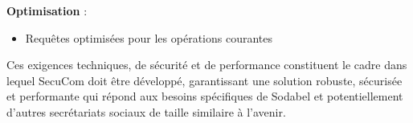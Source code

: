 \vspace{0.5cm}
\textbf{Optimisation} :
\begin{itemize}[leftmargin=*,label=\textcolor{darkgray}{$\bullet$},itemsep=0.3em]
  \item Requêtes optimisées pour les opérations courantes
\end{itemize}

\vspace{1cm}

\begin{tcolorbox}[
  title={\textbf{Cadre des exigences}},
  colback=blue!5!white,
  colframe=primarycolor,
  fonttitle=\bfseries,
  boxrule=0.5mm,
  arc=2mm,
  left=6mm,
  right=6mm,
  top=6mm,
  bottom=6mm
]
Ces exigences techniques, de sécurité et de performance constituent le cadre dans lequel SecuCom doit être développé, garantissant une solution robuste, sécurisée et performante qui répond aux besoins spécifiques de Sodabel et potentiellement d'autres secrétariats sociaux de taille similaire à l'avenir.
\end{tcolorbox}
